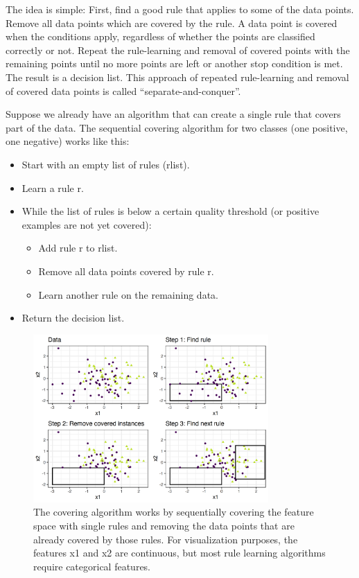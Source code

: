 \documentclass[
  10pt,
]{scrbook}
\providecommand{\tightlist}{%
  \setlength{\itemsep}{0pt}\setlength{\parskip}{0pt}}
\begin{document}
The idea is simple:
First, find a good rule that applies to some of the data points.
Remove all data points which are covered by the rule.
A data point is covered when the conditions apply, regardless of whether the points are classified correctly or not.
Repeat the rule-learning and removal of covered points with the remaining points until no more points are left or another stop condition is met.
The result is a decision list.
This approach of repeated rule-learning and removal of covered data points is called ``separate-and-conquer''.

Suppose we already have an algorithm that can create a single rule that covers part of the data.
The sequential covering algorithm for two classes (one positive, one negative) works like this:

\begin{itemize}
\tightlist
\item
  Start with an empty list of rules (rlist).
\item
  Learn a rule r.
\item
  While the list of rules is below a certain quality threshold (or positive examples are not yet covered):

  \begin{itemize}
  \tightlist
  \item
    Add rule r to rlist.
  \item
    Remove all data points covered by rule r.
  \item
    Learn another rule on the remaining data.
  \end{itemize}
\item
  Return the decision list.
\end{itemize}

\begin{figure}

{\centering \includegraphics[width=0.8\textwidth]{images/covering-algo-1} 

}

\caption{The covering algorithm works by sequentially covering the feature space with single rules and removing the data points that are already covered by those rules. For visualization purposes, the features x1 and x2 are continuous, but most rule learning algorithms require categorical features.}\label{fig:covering-algo}
\end{figure}
\end{document}
